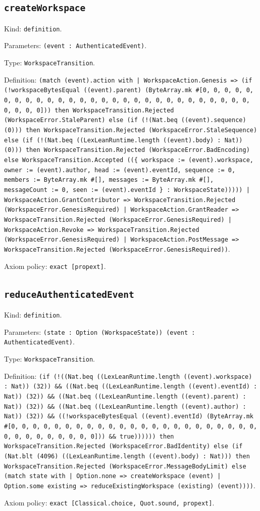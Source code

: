 \documentclass[11pt]{article}
\begin{document}
\subsection*{\texttt{createWorkspace}}
\noindent Kind: \texttt{definition}.\par
\noindent Parameters: \texttt{(event : AuthenticatedEvent)}.\par
\noindent Type: \texttt{WorkspaceTransition}.\par
\noindent Definition: \texttt{(match (event).action with | WorkspaceAction.Genesis => (if (!workspaceBytesEqual ((event).parent) (ByteArray.mk \#[0, 0, 0, 0, 0, 0, 0, 0, 0, 0, 0, 0, 0, 0, 0, 0, 0, 0, 0, 0, 0, 0, 0, 0, 0, 0, 0, 0, 0, 0, 0, 0])) then WorkspaceTransition.Rejected (WorkspaceError.StaleParent) else (if (!(Nat.beq ((event).sequence) (0))) then WorkspaceTransition.Rejected (WorkspaceError.StaleSequence) else (if (!(Nat.beq ((LexLeanRuntime.length ((event).body) : Nat)) (0))) then WorkspaceTransition.Rejected (WorkspaceError.BadEncoding) else WorkspaceTransition.Accepted ((\{ workspace := (event).workspace, owner := (event).author, head := (event).eventId, sequence := 0, members := ByteArray.mk \#[], messages := ByteArray.mk \#[], messageCount := 0, seen := (event).eventId \} : WorkspaceState))))) | WorkspaceAction.GrantContributor => WorkspaceTransition.Rejected (WorkspaceError.GenesisRequired) | WorkspaceAction.GrantReader => WorkspaceTransition.Rejected (WorkspaceError.GenesisRequired) | WorkspaceAction.Revoke => WorkspaceTransition.Rejected (WorkspaceError.GenesisRequired) | WorkspaceAction.PostMessage => WorkspaceTransition.Rejected (WorkspaceError.GenesisRequired))}.\par
\noindent Axiom policy: \texttt{exact [propext]}.\par
\subsection*{\texttt{reduceAuthenticatedEvent}}
\noindent Kind: \texttt{definition}.\par
\noindent Parameters: \texttt{(state : Option (WorkspaceState)) (event : AuthenticatedEvent)}.\par
\noindent Type: \texttt{WorkspaceTransition}.\par
\noindent Definition: \texttt{(if (!((Nat.beq ((LexLeanRuntime.length ((event).workspace) : Nat)) (32)) \&\& ((Nat.beq ((LexLeanRuntime.length ((event).eventId) : Nat)) (32)) \&\& ((Nat.beq ((LexLeanRuntime.length ((event).parent) : Nat)) (32)) \&\& ((Nat.beq ((LexLeanRuntime.length ((event).author) : Nat)) (32)) \&\& ((!workspaceBytesEqual ((event).eventId) (ByteArray.mk \#[0, 0, 0, 0, 0, 0, 0, 0, 0, 0, 0, 0, 0, 0, 0, 0, 0, 0, 0, 0, 0, 0, 0, 0, 0, 0, 0, 0, 0, 0, 0, 0])) \&\& true)))))) then WorkspaceTransition.Rejected (WorkspaceError.BadIdentity) else (if (Nat.blt (4096) ((LexLeanRuntime.length ((event).body) : Nat))) then WorkspaceTransition.Rejected (WorkspaceError.MessageBodyLimit) else (match state with | Option.none => createWorkspace (event) | Option.some existing => reduceExistingWorkspace (existing) (event))))}.\par
\noindent Axiom policy: \texttt{exact [Classical.choice, Quot.sound, propext]}.\par
\end{document}
